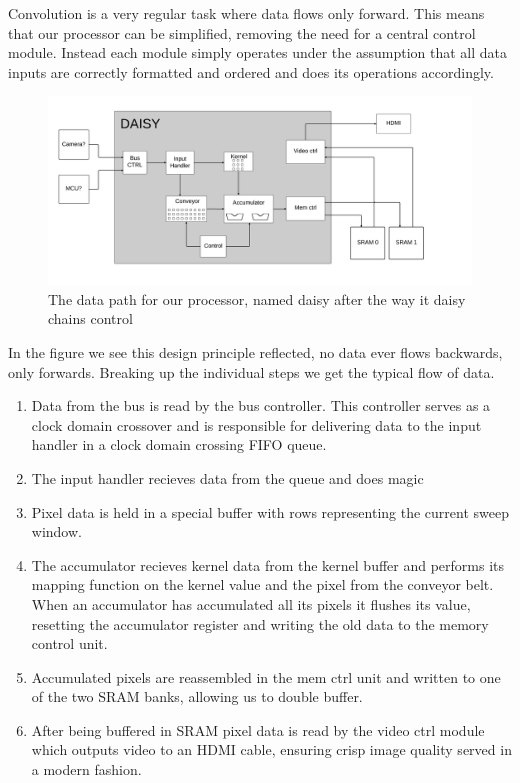 Convolution is a very regular task where data flows only forward. This means that our processor can be simplified, removing the need for a central control module.
Instead each module simply operates under the assumption that all data inputs are correctly formatted and ordered and does its operations accordingly.
\begin{figure}[h!]
    \includegraphics[width=\linewidth]{img/DataPath.png}
    \caption{The data path for our processor, named daisy after the way it daisy chains control}
    \label{fig:Convolution}
\end{figure}
In the figure we see this design principle reflected, no data ever flows backwards, only forwards. 
Breaking up the individual steps we get the typical flow of data.
\begin{enumerate}
  \item Data from the bus is read by the bus controller. This controller serves as a clock domain crossover and is responsible for delivering data to the input handler in a clock domain crossing FIFO queue.
  \item The input handler recieves data from the queue and does magic
  \item Pixel data is held in a special buffer with rows representing the current sweep window.
  \item The accumulator recieves kernel data from the kernel buffer and performs its mapping function on the kernel value and the pixel from the conveyor belt. 
When an accumulator has accumulated all its pixels it flushes its value, resetting the accumulator register and writing the old data to the memory control unit.
  \item Accumulated pixels are reassembled in the mem ctrl unit and written to one of the two SRAM banks, allowing us to double buffer. 
  \item After being buffered in SRAM pixel data is read by the video ctrl module which outputs video to an HDMI cable, ensuring crisp image quality served in a modern fashion.
\end{enumerate}

